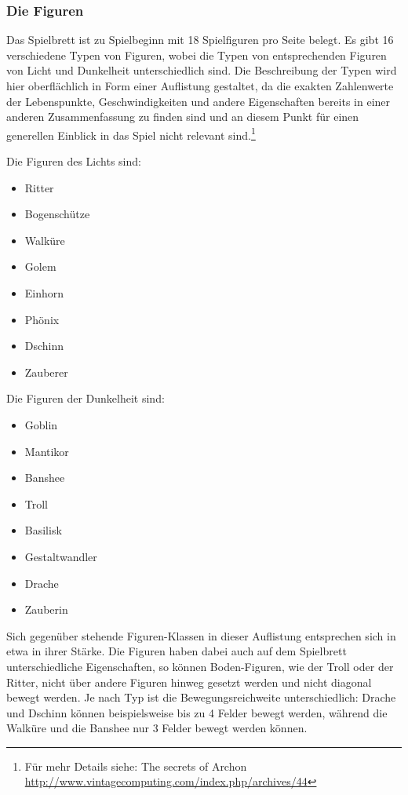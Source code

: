 \subsubsection{Die Figuren}
Das Spielbrett ist zu Spielbeginn mit 18 Spielfiguren pro Seite belegt. Es gibt 16 verschiedene Typen von Figuren, wobei die Typen von entsprechenden Figuren von Licht und Dunkelheit unterschiedlich sind. Die Beschreibung der Typen wird hier oberflächlich in Form einer Auflistung gestaltet, da die exakten Zahlenwerte der Lebenspunkte, Geschwindigkeiten und andere Eigenschaften bereits in einer anderen Zusammenfassung zu finden sind und an diesem Punkt für einen generellen Einblick in das Spiel nicht relevant sind.\footnote{Für mehr Details siehe: The secrets of Archon \url{http://www.vintagecomputing.com/index.php/archives/44}}
\begin{multicols}{2}
	Die Figuren des Lichts sind: 
	\begin{itemize}
		\item Ritter
		\item Bogenschütze
		\item Walküre
		\item Golem
		\item Einhorn
		\item Phönix
		\item Dschinn
		\item Zauberer
	\end{itemize}
\columnbreak
	Die Figuren der Dunkelheit sind:
	\begin{itemize}
		\item Goblin
		\item Mantikor
		\item Banshee
		\item Troll
		\item Basilisk
		\item Gestaltwandler
		\item Drache
		\item Zauberin
	\end{itemize}
\end{multicols}
\noindent Sich gegenüber stehende Figuren-Klassen in dieser Auflistung entsprechen sich in etwa in ihrer Stärke. Die Figuren haben dabei auch auf dem Spielbrett unterschiedliche Eigenschaften, so können Boden-Figuren, wie der Troll oder der Ritter, nicht über andere Figuren hinweg gesetzt werden und nicht diagonal bewegt werden. Je nach Typ ist die Bewegungsreichweite unterschiedlich: Drache und Dschinn können beispielsweise bis zu 4 Felder bewegt werden, während die Walküre und die Banshee nur 3 Felder bewegt werden können.\\
